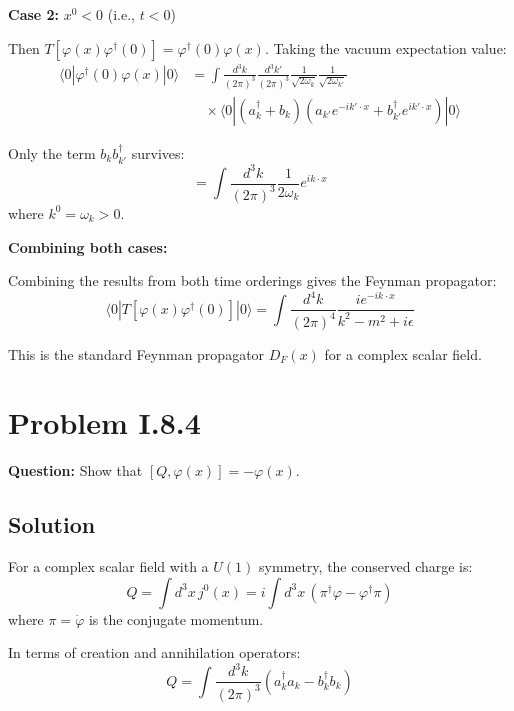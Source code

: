 \documentclass[12pt]{article}
\begin{document}
\textbf{Case 2:} $x^0 < 0$ (i.e., $t < 0$)

Then $T[\varphi(x)\varphi^\dagger(0)] = \varphi^\dagger(0)\varphi(x)$. Taking the vacuum expectation value:
\begin{align}
\langle 0 | \varphi^\dagger(0)\varphi(x) | 0 \rangle &= \int \frac{d^3k}{(2\pi)^3} \frac{d^3k'}{(2\pi)^3} \frac{1}{\sqrt{2\omega_k}} \frac{1}{\sqrt{2\omega_{k'}}} \nonumber \\
&\quad \times \langle 0 | (a_k^\dagger + b_k)(a_{k'} e^{-ik'\cdot x} + b_{k'}^\dagger e^{ik'\cdot x}) | 0 \rangle
\end{align}

Only the term $b_k b_{k'}^\dagger$ survives:
\begin{equation}
= \int \frac{d^3k}{(2\pi)^3} \frac{1}{2\omega_k} e^{ik\cdot x}
\end{equation}
where $k^0 = \omega_k > 0$.

\textbf{Combining both cases:}

Combining the results from both time orderings gives the Feynman propagator:
\begin{equation}
\langle 0 | T[\varphi(x)\varphi^\dagger(0)] | 0 \rangle = \int \frac{d^4k}{(2\pi)^4} \frac{i e^{-ik\cdot x}}{k^2 - m^2 + i\epsilon}
\end{equation}

This is the standard Feynman propagator $D_F(x)$ for a complex scalar field.

\section*{Problem I.8.4}
\textbf{Question:} Show that $[Q, \varphi(x)] = -\varphi(x)$.

\subsection*{Solution}

For a complex scalar field with a $U(1)$ symmetry, the conserved charge is:
\begin{equation}
Q = \int d^3x \, j^0(x) = i \int d^3x \, (\pi^\dagger \varphi - \varphi^\dagger \pi)
\end{equation}
where $\pi = \dot{\varphi}$ is the conjugate momentum.

In terms of creation and annihilation operators:
\begin{equation}
Q = \int \frac{d^3k}{(2\pi)^3} (a_k^\dagger a_k - b_k^\dagger b_k)
\end{equation}
\end{document}

